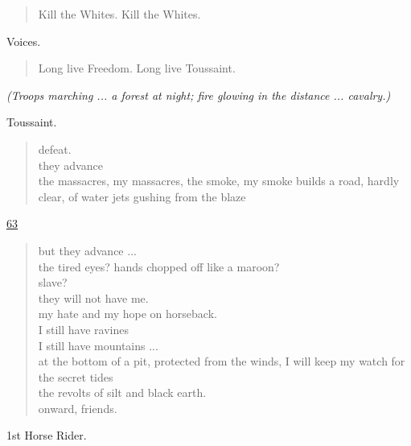 \documentclass[letterpaper,article,12pt,oneside,notitlepage]{memoir}
\begin{document}
\begin{verse}
\hspace{1cm} Kill the Whites. Kill the Whites. \\
\end{verse}

\begin{center}Voices.\end{center}

\begin{verse}
\hspace{1cm} Long live Freedom. Long live Toussaint. \\
\end{verse}

\textit{(Troops marching ... a forest at night; fire glowing in the distance ... cavalry.)}

\begin{center}Toussaint.\end{center}

\begin{verse}
defeat. \\
they advance \\
the massacres, my massacres, the smoke, my smoke builds a road, hardly clear, of water jets gushing from the blaze \\
\end{verse}

\clearpage

\href{http://cesaire.elotroalex.com/chiens/chiens/p063.html}{63}

\begin{verse}
but they advance ... \\
the tired eyes? hands chopped off like a maroon? \\
slave? \\
they will not have me. \\
my hate and my hope on horseback. \\
I still have ravines \\
I still have mountains ... \\
at the bottom of a pit, protected from the winds, I will keep my watch for the secret tides \\
the revolts of silt and black earth. \\
onward, friends. \\
\end{verse}

\begin{center}1st Horse Rider.\end{center}
\end{document}
